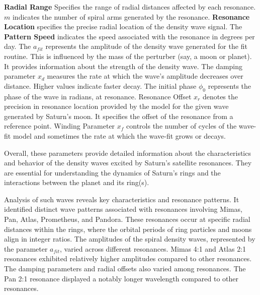 \documentclass{article}
\begin{document}
\textbf{Radial Range} Specifies the range of radial distances affected by each resonance. \textbf{$m$} indicates the number of spiral arms generated by the resonance. \textbf{Resonance Location} specifies the precise radial location of the density wave signal. The \textbf{Pattern Speed} indicates the speed associated with the resonance in degrees per day. The \textbf{$a_{fit}$} represents the amplitude of the density wave generated for the fit routine. This is influenced by the mass of the perturber (say, a moon or planet). It provides information about the strength of the density wave. The damping parameter \textbf{$x_{d}$} measures the rate at which the wave's amplitude decreases over distance. Higher values indicate faster decay. The initial phase \textbf{$\phi_{0}$} represents the phase of the wave in radians, at resonance. Resonance Offset \textbf{$x_{r}$} denotes the precision in resonance location provided by the model for the given wave generated by Saturn's moon. It specifies the offset of the resonance from a reference point. Winding Parameter \textbf{$x_{f}$} controls the number of cycles of the wave-fit model and sometimes the rate at which the wave-fit grows or decays.

Overall, these parameters provide detailed information about the characteristics and behavior of the density waves excited by Saturn's satellite resonances. They are essential for understanding the dynamics of Saturn's rings and the interactions between the planet and its ring(s).

Analysis of such waves reveals key characteristics and resonance patterns. It identified distinct wave patterns associated with resonances involving Mimas, Pan, Atlas, Prometheus, and Pandora. These resonances occur at specific radial distances within the rings, where the orbital periods of ring particles and moons align in integer ratios. The amplitudes of the spiral density waves, represented by the parameter $a_{fit}$, varied across different resonances. Mimas 4:1 and Atlas 2:1 resonances exhibited relatively higher amplitudes compared to other resonances. The damping parameters and radial offsets also varied among resonances. The Pan 2:1 resonance displayed a notably longer wavelength compared to other resonances.

\end{document}
